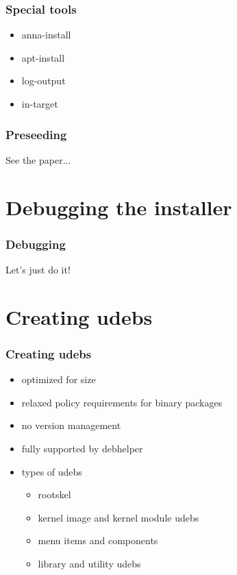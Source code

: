 \documentclass{beamer}
\begin{document}
\begin{frame}
  \frametitle{Special tools}
	\begin{itemize}
	\item anna-install
	\item apt-install
	\item log-output
	\item in-target
	\end{itemize}
\end{frame}

\begin{frame}
  \frametitle{Preseeding}
\begin{large}
	See the paper...
\end{large}
\end{frame}

\section{Debugging the installer}

\begin{frame}
  \frametitle{Debugging}
\begin{huge}
	Let's just do it!
\end{huge}
\end{frame}

\section{Creating udebs}

\begin{frame}
  \frametitle{Creating udebs}
	\begin{itemize}
	\item
		optimized for size
	\item
		relaxed policy requirements for binary packages
	\item
		no version management
	\item
		fully supported by debhelper
	\item
		types of udebs
		\begin{itemize}
		\item
			rootskel
		\item
			kernel image and kernel module udebs
		\item
			menu items and components
		\item
			library and utility udebs
		\end{itemize}
	\end{itemize}
\end{frame}
\end{document}
